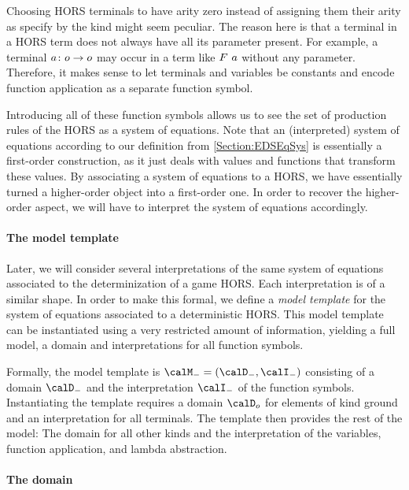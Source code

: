 \documentclass[../../diss.tex]{subfiles}
\begin{document}
Choosing HORS terminals to have arity zero instead of assigning them their arity as specify by the kind might seem peculiar.
The reason here is that a terminal in a HORS term does not always have all its parameter present.
For example, a terminal $a \colon o \to o$ may occur in a term like $F\  a$ without any parameter.
Therefore, it makes sense to let terminals and variables be constants and encode function application as a separate function symbol.

Introducing all of these function symbols allows us to see the set of production rules of the HORS as a system of equations.
Note that an (interpreted) system of equations according to our definition from \cref{Section:EDSEqSys} is essentially a first-order construction, as it just deals with values and functions that transform these values.
By associating a system of equations to a HORS, we have essentially turned a higher-order object into a first-order one.
In order to recover the higher-order aspect, we will have to interpret the system of equations accordingly.

\paragraph{The model template}

Later, we will consider several interpretations of the same system of equations associated to the determinization of a game HORS.\@
Each interpretation is of a similar shape.
In order to make this formal, we define a \emph{model template} for the system of equations associated to a deterministic HORS.\@
This model template can be instantiated using a very restricted amount of information, yielding a full model, \ie a domain and interpretations for all function symbols.

Formally, the model template is $\modelt = (\domaint,\interpretationt)$ consisting of a domain $\domaint$ and the interpretation $\interpretationt$ of the function symbols.
Instantiating the template requires a domain $\domain{\ground}$ for elements of kind ground and an interpretation for all terminals.
The template then provides the rest of the model:
The domain for all other kinds and the interpretation of the variables, function application, and lambda abstraction.

\paragraph{The domain}
\end{document}
